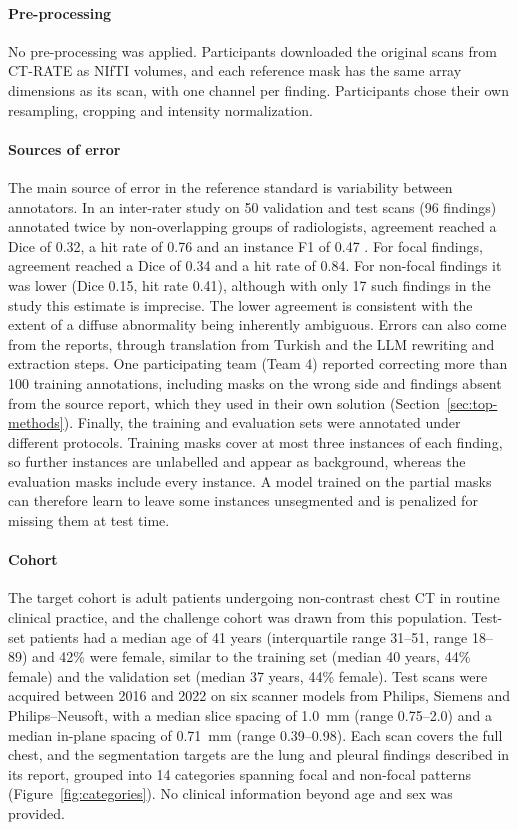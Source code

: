 \documentclass[final,5p,times,twocolumn,authoryear,numafflabel]{elsarticle}
\begin{document}
\paragraph{Pre-processing}
No pre-processing was applied. Participants downloaded the original scans
from CT-RATE as NIfTI volumes, and each reference mask has the same array
dimensions as its scan, with one channel per finding. Participants chose their
own resampling, cropping and intensity normalization.

\paragraph{Sources of error}
The main source of error in the reference standard is variability between
annotators. In an inter-rater study on 50 validation and test scans
(96 findings) annotated twice by non-overlapping groups of radiologists,
agreement reached a Dice of 0.32, a hit rate of 0.76 and an instance
F1 of 0.47 \citep{baharoon2026rexgroundingct}.
For focal findings, agreement reached a Dice of 0.34 and a hit rate of
0.84. For non-focal findings it was lower (Dice 0.15, hit rate
0.41), although with only 17 such findings in the study this
estimate is imprecise. The lower agreement is consistent with the extent of a
diffuse abnormality being inherently ambiguous. Errors can also come
from the reports, through translation from Turkish and the LLM rewriting and
extraction steps.
One participating team (Team 4) reported correcting more than 100 training
annotations, including masks on the wrong side and findings absent from the
source report, which they used in their own solution
(Section~\ref{sec:top-methods}). Finally, the training and
evaluation sets were annotated under different protocols. Training masks
cover at most three instances of each finding, so further instances are
unlabelled and appear as background, whereas the evaluation masks include
every instance. A model trained on the partial masks can therefore learn to
leave some instances unsegmented and is penalized for missing them at test time.

\paragraph{Cohort}\label{sec:cohorts}
The target cohort is adult patients undergoing non-contrast chest CT in routine
clinical practice, and the challenge cohort was drawn from this population. Test-set
patients had a median age of 41 years (interquartile
range 31--51, range 18--89) and 42\% were female, similar to
the training set (median 40 years, 44\% female) and the validation
set (median 37 years, 44\% female). Test scans were acquired between
2016 and 2022 on six scanner models from Philips, Siemens and
Philips--Neusoft, with a median slice spacing of 1.0~mm (range
0.75--2.0) and a median in-plane spacing of 0.71~mm (range
0.39--0.98). Each scan covers the full chest, and the
segmentation targets are the lung and pleural findings described in its
report, grouped into 14 categories
spanning focal and non-focal patterns (Figure~\ref{fig:categories}). No clinical information
beyond age and sex was provided.
\end{document}
